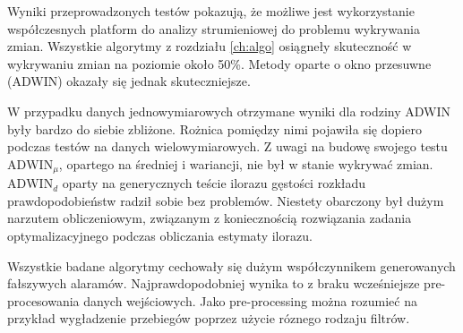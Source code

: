 Wyniki przeprowadzonych testów pokazują,
że możliwe jest wykorzystanie współczesnych platform do analizy strumieniowej
do problemu wykrywania zmian.
Wszystkie algorytmy z rozdziału \ref{ch:algo} osiągneły skuteczność w wykrywaniu zmian
na poziomie około 50\%.
Metody oparte o okno przesuwne (ADWIN) okazały się jednak skuteczniejsze.

W przypadku danych jednowymiarowych otrzymane wyniki dla rodziny ADWIN były bardzo do siebie zbliżone.
Rożnica pomiędzy nimi pojawiła się dopiero podczas testów na danych wielowymiarowych.
Z uwagi na budowę swojego testu $\mbox{ADWIN}_\mu$, opartego na średniej i wariancji,
nie był w stanie wykrywać zmian.
$\mbox{ADWIN}_d$ oparty na generycznych teście ilorazu gęstości rozkładu prawdopodobieństw radził sobie bez problemów.
Niestety obarczony był dużym narzutem obliczeniowym,
związanym z koniecznością rozwiązania zadania optymalizacyjnego podczas obliczania estymaty ilorazu.

Wszystkie badane algorytmy cechowały się dużym współczynnikem generowanych fałszywych alaramów.
Najprawdopodobniej wynika to z braku wcześniejsze pre-procesowania danych wejściowych.
Jako pre-processing można rozumieć na przykład wygładzenie przebiegów poprzez użycie róznego rodzaju filtrów.
